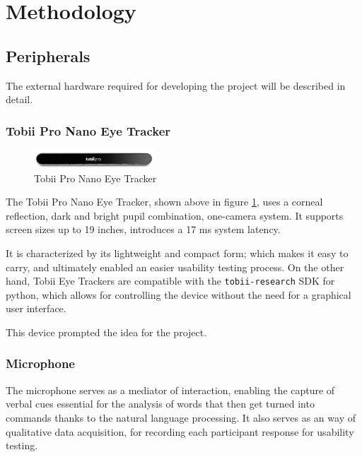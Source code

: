 \section{Methodology}


\subsection{Peripherals}

The external hardware required for developing the project will be described in detail.

\subsubsection{Tobii Pro Nano Eye Tracker}

\begin{figure}[ht]
    \centering
    \includegraphics[width=0.4\textwidth]{images/tobii-pro-nano.png}
    \caption{Tobii Pro Nano Eye Tracker}
    \label{fig:tobii-eye-tracker}
\end{figure}

The Tobii Pro Nano Eye Tracker, shown above in figure \ref{fig:tobii-eye-tracker}, uses a corneal reflection, dark and bright pupil combination, one-camera system. It supports screen sizes up to 19 inches, introduces a 17 ms system latency. \citep{tobiipronano-manual}

It is characterized by its lightweight and compact form; which makes it easy to carry, and ultimately enabled an easier usability testing process. On the other hand, Tobii Eye Trackers are compatible with the \verb|tobii-research| SDK for python, which allows for controlling the device without the need for a graphical user interface.

This device prompted the idea for the project.

\subsubsection{Microphone}

The microphone serves as a mediator of interaction, enabling the capture of verbal cues essential for the analysis of words that then get turned into commands thanks to the natural language processing. It also serves as an way of qualitative data acquisition, for recording each participant response for usability testing.

